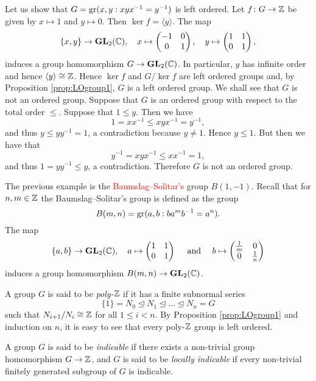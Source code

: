 \begin{example}
	Let us show that $G=\operatorname{gr}( x,y:xyx^{-1}=y^{-1})$ is left ordered. Let 
	$f\colon G\to\mathbb{Z}$ be given by $x\mapsto 1$ and $y\mapsto 0$. Then $\ker f=\langle y\rangle$. 
	 The map
\[
\{ x,y\}\to\mathbf{GL}_2(\mathbb{C}),
\quad 
x\mapsto\begin{pmatrix}
-1&0\\
0&1	
\end{pmatrix},
\quad
y\mapsto\begin{pmatrix}
1&1\\
0&1	
\end{pmatrix},
\]
induces a group homomorphism $G\to \mathbf{GL}_2(\mathbb{C})$. 
In particular, $y$ has infinite order and hence $\langle y\rangle\cong\mathbb{Z}$. Hence $\ker f$ and $G/\ker f$ are left ordered groups and, by Proposition \ref{prop:LOgroup1}, $G$ is a left ordered group. We shall see that $G$ is not an ordered group. Suppose that $G$ is an ordered group with respect to the total order $\leq$. Suppose that $1\leq y$. Then we have
\[ 1=xx^{-1}\leq xyx^{-1}=y^{-1},\]
and thus $y\leq yy^{-1}=1$, a contradiction because $y\neq 1$. Hence $y\leq 1$. But then we have that
\[ y^{-1}=xyx^{-1}\leq xx^{-1}=1,\]
and thus $1=yy^{-1}\leq  y$, a contradiction. Therefore $G$ is not an ordered group.
\end{example}

The previous example is the \textcolor{red}{Baumslag--Solitar's} group $B(1,-1)$. Recall that for $n,m\in\mathbb{Z}$
the Baumslag--Solitar's group is defined as the 
group \[
B(m,n)=\operatorname{gr}(a,b:ba^mb^{-1}=a^n).
\]
The map 
\[
\{ a,b\}\to\mathbf{GL}_2(\mathbb{C}),\quad
a\mapsto\begin{pmatrix}
1&1\\
0&1	
\end{pmatrix}\quad\text{ and }\quad  
b\mapsto\begin{pmatrix}
\frac{1}{m}&0\\
0&\frac{1}{n}	
\end{pmatrix}
\] 
induces a group homomorphism $B(m,n)\to \mathbf{GL}_2(\mathbb{C})$.



A group $G$ is said to be {\em poly-$\mathbb{Z}$} if it has a finite subnormal series
\[ \{ 1\}=N_0\unlhd N_1\unlhd\dots\unlhd N_n=G\]
such that $N_{i+1}/N_{i}\cong \mathbb{Z}$ for all $1\leq i<n$.
By Proposition \ref{prop:LOgroup1} and induction on $n$, it is easy to see that every poly-$\mathbb{Z}$ group is left ordered. 

A group $G$ is said to be {\em indicable} if there exists a non-trivial 
group homomorphism $G\to\mathbb{Z}$, and $G$ is said to be {\em locally indicable} 
if every non-trivial finitely generated subgroup of $G$ is indicable.  

